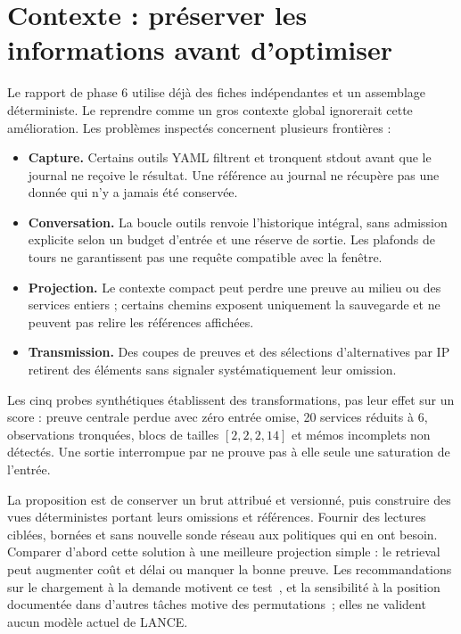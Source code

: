\documentclass[11pt,a4paper]{article}
\newcommand{\code}[1]{{\small\ttfamily\path{#1}}}
\begin{document}
\section{Contexte : préserver les informations avant d'optimiser}
Le rapport de phase 6 utilise déjà des fiches indépendantes et un assemblage
déterministe. Le reprendre comme un gros contexte global ignorerait cette
amélioration. Les problèmes inspectés concernent plusieurs frontières :
\begin{itemize}
\item \textbf{Capture.} Certains outils YAML filtrent et tronquent stdout avant
que le journal ne reçoive le résultat. Une référence au journal ne récupère pas
une donnée qui n'y a jamais été conservée.
\item \textbf{Conversation.} La boucle outils renvoie l'historique intégral,
sans admission explicite selon un budget d'entrée et une réserve de sortie.
Les plafonds de tours ne garantissent pas une requête compatible avec la fenêtre.
\item \textbf{Projection.} Le contexte compact peut perdre une preuve au milieu
ou des services entiers ; certains chemins exposent uniquement la sauvegarde et
ne peuvent pas relire les références affichées.
\item \textbf{Transmission.} Des coupes de preuves et des sélections d'alternatives
par IP retirent des éléments sans signaler systématiquement leur omission.
\end{itemize}

Les cinq probes synthétiques établissent des transformations, pas leur effet
sur un score : preuve centrale perdue avec zéro entrée omise, 20 services réduits
à 6, observations tronquées, blocs de tailles $[2,2,2,14]$ et mémos incomplets
non détectés. Une sortie interrompue par \code{finish_reason=length} ne prouve
pas à elle seule une saturation de l'entrée.

La proposition est de conserver un brut attribué et versionné, puis construire
des vues déterministes portant leurs omissions et références. Fournir des
lectures ciblées, bornées et sans nouvelle sonde réseau aux politiques qui en
ont besoin. Comparer d'abord cette solution à une meilleure projection
simple : le retrieval peut augmenter coût et délai ou manquer la bonne preuve.
Les recommandations sur le chargement à la demande motivent ce test~\cite{context},
et la sensibilité à la position documentée dans d'autres tâches motive des
permutations~\cite{lost}; elles ne valident aucun modèle actuel de LANCE.
\end{document}
